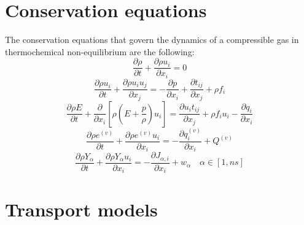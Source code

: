 \documentclass[oneside,a4paper,11pt]{report}
\begin{document}
\section{Conservation equations}
The conservation equations that govern the dynamics of a compressible gas in thermochemical non-equilibrium are the following:
\begin{equation}
\frac{\partial \rho}{\partial t} + \frac{\partial \rho u_i}{\partial x_i} = 0
\end{equation}
\begin{equation}
\frac{\partial \rho u_i}{\partial t} + \frac{\partial \rho u_i u_j}{\partial x_j} = - \frac{\partial p}{\partial x_i} + \frac{\partial t_{ij}}{\partial x_j} + \rho f_i
\end{equation}
\begin{equation}
\frac{\partial \rho E}{\partial t} + \frac{\partial}{\partial x_i} \left [ \rho \left ( E + \frac{p}{\rho} \right ) u_i \right ] = \frac{\partial u_i t_{ij}}{\partial x_j} + \rho f_i u_i -  \frac{\partial q_i}{\partial x_i}
\end{equation}
\begin{equation}
\frac{\partial \rho e^{(v)}}{\partial t} + \frac{\partial \rho e^{(v)} u_i}{\partial x_i}  = -  \frac{\partial q_i^{(v)}}{\partial x_i} + Q^{(v)}
\end{equation}
\begin{equation}
\frac{\partial\rho Y_\alpha}{\partial t}+\frac{\partial \rho Y_\alpha u_i}{\partial x_i} = -\frac{\partial J_{\alpha,i}}{\partial x_i} + w_\alpha \quad \alpha \in [1,ns]
\end{equation}

\section{Transport models}

\end{document}
